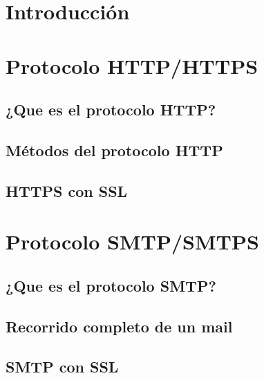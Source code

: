 
\section{Introducción}
\section{Protocolo HTTP/HTTPS}
    \subsection{¿Que es el protocolo HTTP?}
    \subsection{Métodos del protocolo HTTP}
    \subsection{HTTPS con SSL}

\section{Protocolo SMTP/SMTPS}
    \subsection{¿Que es el protocolo SMTP?}
    \subsection{Recorrido completo de un mail}
    \subsection{SMTP con SSL}




